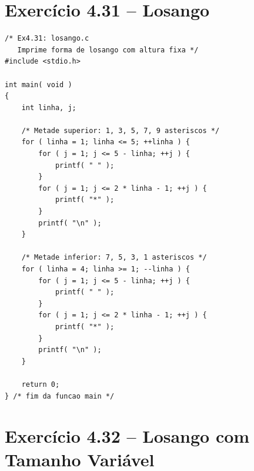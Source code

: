 \documentclass[12pt,a4paper]{article}
\begin{document}
\section{Exercício 4.31 -- Losango}

\begin{respostabox}
\begin{lstlisting}
/* Ex4.31: losango.c
   Imprime forma de losango com altura fixa */
#include <stdio.h>

int main( void )
{
    int linha, j;

    /* Metade superior: 1, 3, 5, 7, 9 asteriscos */
    for ( linha = 1; linha <= 5; ++linha ) {
        for ( j = 1; j <= 5 - linha; ++j ) {
            printf( " " );
        }
        for ( j = 1; j <= 2 * linha - 1; ++j ) {
            printf( "*" );
        }
        printf( "\n" );
    }

    /* Metade inferior: 7, 5, 3, 1 asteriscos */
    for ( linha = 4; linha >= 1; --linha ) {
        for ( j = 1; j <= 5 - linha; ++j ) {
            printf( " " );
        }
        for ( j = 1; j <= 2 * linha - 1; ++j ) {
            printf( "*" );
        }
        printf( "\n" );
    }

    return 0;
} /* fim da funcao main */
\end{lstlisting}
\end{respostabox}

\newpage

\section{Exercício 4.32 -- Losango com Tamanho Variável}
\end{document}
